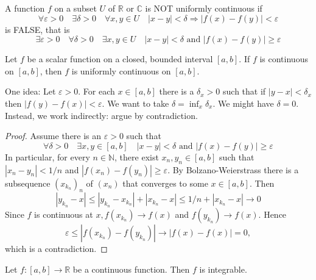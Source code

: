 \documentclass[a4paper]{article}
\begin{document}
\begin{note}
    A function $f$ on a subset $U$ of $\mathbb{R}$ or $\mathbb{C}$ is NOT uniformly continuous if
    \[
        \forall \varepsilon>0 \quad \exists \delta>0 \quad \forall x, y \in U \quad|x-y|<\delta \Longrightarrow|f(x)-f(y)|<\varepsilon
    \]
    is FALSE, that is
    \[
        \exists \varepsilon>0 \quad \forall \delta>0 \quad \exists x, y \in U \quad|x-y|<\delta \text{ and }|f(x)-f(y)| \geqslant \varepsilon
    \]
\end{note}
\begin{theorem}\label{thm:9}
    Let $f$ be a scalar function on a closed, bounded interval $[a, b]$. If $f$ is continuous on $[a, b]$, then $f$ is uniformly continuous on $[a, b]$. 
\end{theorem}
One idea: Let $\varepsilon>0$. For each $x \in[a, b]$ there is a $\delta_{x}>0$ such that if $|y-x|<\delta_{x}$ then $|f(y)-f(x)|<\varepsilon$. We want to take $\delta=\inf _{x} \delta_{x} .$ We might have $\delta=0$. Instead, we work indirectly: argue by contradiction.
\begin{proof}
    Assume there is an $\varepsilon>0$ such that
    \[
        \forall \delta>0 \quad \exists x, y \in[a, b] \quad|x-y|<\delta \text{ and }|f(x)-f(y)| \geqslant \varepsilon
    \]
    In particular, for every $n \in \mathbb{N}$, there exist $x_{n}, y_{n} \in[a, b]$ such that $\left|x_{n}-y_{n}\right|<1 / n$ and $\left|f\left(x_{n}\right)-f\left(y_{n}\right)\right| \geqslant \varepsilon$. By Bolzano-Weierstrass there is a subsequence $\left(x_{k_{n}}\right)_{n}$ of $\left(x_{n}\right)$ that converges to some $x \in[a, b]$. Then
    \[
    \left|y_{k_{n}}-x\right| \leqslant\left|y_{k_{n}}-x_{k_{n}}\right|+\left|x_{k_{n}}-x\right| \leqslant 1 / n+\left|x_{k_{n}}-x\right| \rightarrow 0
    \]
    Since $f$ is continuous at $x, f\left(x_{k_{n}}\right) \rightarrow f(x)$ and $f\left(y_{k_{n}}\right) \rightarrow f(x)$. Hence 
    \[
        \varepsilon \leqslant\left|f\left(x_{k_{n}}\right)-f\left(y_{k_{n}}\right)\right| \rightarrow|f(x)-f(x)|=0,
    \]
    which is a contradiction.
\end{proof}
\begin{corollary}\label{col:10}
    Let $f:[a, b] \rightarrow \mathbb{R}$ be a continuous function. Then $f$ is integrable.
\end{corollary}
\end{document}
